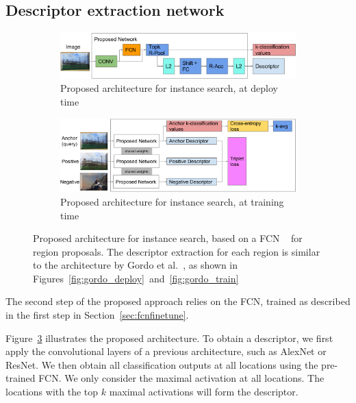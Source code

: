 \subsection{Descriptor extraction network}
\begin{figure}
\begin{subfigure}{\textwidth}
\includegraphics[width=\textwidth]{img/contrib_deploy.png}
\caption{Proposed architecture for instance search, at deploy time
\label{fig:contribdeploy}}
\end{subfigure}

\begin{subfigure}{\textwidth}
\includegraphics[width=\textwidth]{img/contrib_train.png}
\caption{Proposed architecture for instance search, at training time
\label{fig:contribtrain}}
\end{subfigure}
\caption{Proposed architecture for instance search, based on a FCN
~\cite{long_fully_2015} for region proposals. The descriptor extraction
for each region is similar to the architecture by
Gordo et al.~\cite{gordo_deep_2016}, as shown in
Figures~\ref{fig:gordo_deploy}~and~\ref{fig:gordo_train}
\label{fig:contrib}}
\end{figure}

The second step of the proposed approach relies on the FCN, trained
as described in the first step in Section~\ref{sec:fcnfinetune}.

Figure~\ref{fig:contrib} illustrates the proposed architecture.
To obtain a descriptor, we first apply the convolutional layers of
a previous architecture, such as AlexNet or ResNet. We then obtain all
classification outputs at all locations using the pre-trained FCN.
We only consider the maximal activation at all locations.
The locations with the top $k$ maximal activations will form the descriptor.

